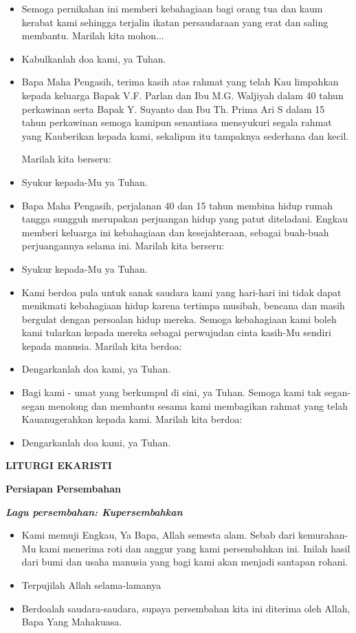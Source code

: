 \documentclass[10pt]{book}
\makeatletter
\newcommand{\judul}[1]{%
  {\parindent \z@ \centering \normalfont
    \interlinepenalty\@M \Large \bfseries #1\par\nobreak \vskip 20\p@ }}
\newcommand{\subjudul}[1]{%
  {\parindent \z@ \normalfont
    \interlinepenalty\@M \bfseries #1\par\nobreak \vskip 20\p@ }}
\newcommand{\lagu}[1]{%
  {\parindent \z@ \normalfont
    \interlinepenalty\@M \bfseries \emph{#1}\par\nobreak \vskip 20\p@ }}
\newcommand{\BU}[1]{\begin{itemize} \item[U:] #1 \end{itemize}}
\newcommand{\BI}[1]{\begin{itemize} \item[I:] #1 \end{itemize}}
\newcommand{\BP}[1]{\begin{itemize} \item[P:] #1 \end{itemize}}
\newcommand{\BMP}[1]{\begin{itemize} \item[W+N:] #1 \end{itemize}}
\newcommand{\ultah}{40 }
\newcommand{\suami}{V.F. Parlan }
\newcommand{\istri}{M.G. Waljiyah }
\newcommand{\ultahdua}{15 }
\newcommand{\suamidua}{Y. Suyanto }
\newcommand{\istridua}{Th. Prima Ari S }
\makeatother
\begin{document}
\BMP{Semoga pernikahan ini memberi kebahagiaan bagi orang tua dan kaum kerabat kami sehingga terjalin ikatan persaudaraan yang erat dan saling membantu.
Marilah kita mohon...}

\BU{Kabulkanlah doa kami, ya Tuhan.}

\BP{Bapa Maha Pengasih, terima kasih atas rahmat yang telah Kau limpahkan kepada keluarga Bapak \suami dan Ibu \istri 
dalam \ultah tahun perkawinan serta Bapak \suamidua dan Ibu \istridua dalam \ultahdua tahun perkawinan semoga kamipun senantiasa mensyukuri segala rahmat yang Kauberikan kepada kami, sekalipun itu tampaknya sederhana dan kecil.

Marilah kita berseru:}

\BU{Syukur kepada-Mu ya Tuhan.}

\BP{Bapa Maha Pengasih, perjalanan \ultah dan \ultahdua tahun membina hidup rumah tangga sungguh merupakan perjuangan hidup yang patut diteladani. Engkau memberi keluarga ini kebahagiaan dan kesejahteraan, sebagai buah-buah perjuangannya selama ini. Marilah kita berseru:}

\BU{Syukur kepada-Mu ya Tuhan.}

\BP{Kami berdoa pula untuk sanak saudara kami yang hari-hari ini tidak dapat menikmati kebahagiaan hidup karena tertimpa musibah, bencana dan masih bergulat dengan persoalan hidup mereka. Semoga kebahagiaan kami boleh kami tularkan kepada mereka sebagai perwujudan cinta kasih-Mu sendiri kepada manusia. Marilah kita berdoa:}

\BU{Dengarkanlah doa kami, ya Tuhan.}

\BP{Bagi kami - umat yang berkumpul di sini, ya Tuhan. Semoga kami tak segan-segan menolong dan membantu sesama kami membagikan rahmat yang telah Kauanugerahkan kepada kami. Marilah kita berdoa:}

\BU{Dengarkanlah doa kami, ya Tuhan.}

\judul{LITURGI EKARISTI}

\subjudul{Persiapan Persembahan}

\lagu{Lagu persembahan: Kupersembahkan}

\BI{Kami memuji Engkau, Ya Bapa, Allah semesta alam. Sebab dari kemurahan-Mu kami menerima roti dan anggur yang kami persembahkan ini. Inilah hasil dari bumi dan usaha manusia yang bagi kami akan menjadi santapan rohani.}

\BU{Terpujilah Allah selama-lamanya}

\BI{Berdoalah saudara-saudara, supaya persembahan kita ini diterima oleh Allah, Bapa Yang Mahakuasa.}
\end{document}
